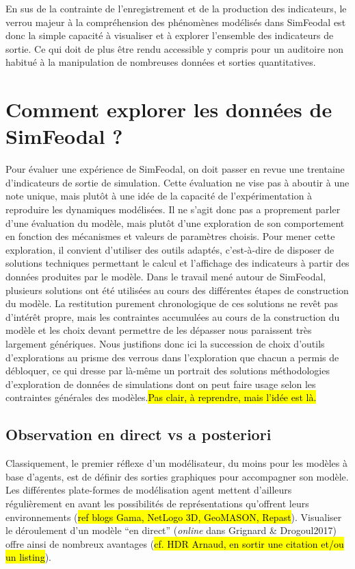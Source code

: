 	En sus de la contrainte de l'enregistrement et de la production des indicateurs, le verrou majeur à la compréhension des phénomènes modélisés dans SimFeodal est donc la simple capacité à visualiser et à explorer l'ensemble des indicateurs de sortie.
	Ce qui doit de plus être rendu accessible y compris pour un auditoire non habitué à la manipulation de nombreuses données et sorties quantitatives.
	
\clearpage
\section{Comment explorer les données de SimFeodal ?}

	Pour évaluer une expérience de SimFeodal, on doit passer en revue une trentaine d'indicateurs de sortie de simulation.
	Cette évaluation ne vise pas à aboutir à une note unique, mais plutôt à une idée de la capacité de l'expérimentation à reproduire les dynamiques modélisées.
	Il ne s'agit donc pas a proprement parler d'une évaluation du modèle, mais plutôt d'une exploration de son comportement en fonction des mécanismes et valeurs de paramètres choisis.
	Pour mener cette exploration, il convient d'utiliser des outils adaptés, c'est-à-dire de disposer de solutions techniques permettant le calcul et l'affichage des indicateurs à partir des données produites par le modèle.
	Dans le travail mené autour de SimFeodal, plusieurs solutions ont été utilisées au cours des différentes étapes de construction du modèle.
	La restitution purement chronologique de ces solutions ne revêt pas d'intérêt propre, mais les contraintes accumulées au cours de la construction du modèle et les choix devant permettre de les dépasser nous paraissent très largement génériques.
	Nous justifions donc ici la succession de choix d'outils d'explorations au prisme des verrous dans l'exploration que chacun a permis de débloquer, ce qui dresse par là-même un portrait des solutions méthodologies d'exploration de données de simulations dont on peut faire usage selon les contraintes générales des modèles.\hl{Pas clair, à reprendre, mais l'idée est là.}
	
	\subsection{Observation en direct vs a posteriori}\label{subsec:observation-a-posteriori}

	Classiquement, le premier réflexe d'un modélisateur, du moins pour les modèles à base d'agents, est de définir des sorties graphiques pour accompagner son modèle.
	Les différentes plate-formes de modélisation agent mettent d'ailleurs régulièrement en avant les possibilités de représentations qu'offrent leurs environnements (\hl{ref blogs Gama, NetLogo 3D, GeoMASON, Repast}).
	Visualiser le déroulement d'un modèle ``en direct'' (\textit{online} dans Grignard \& Drogoul2017) offre ainsi de nombreux avantages (\hl{cf. HDR Arnaud, en sortir une citation et/ou un listing}).

